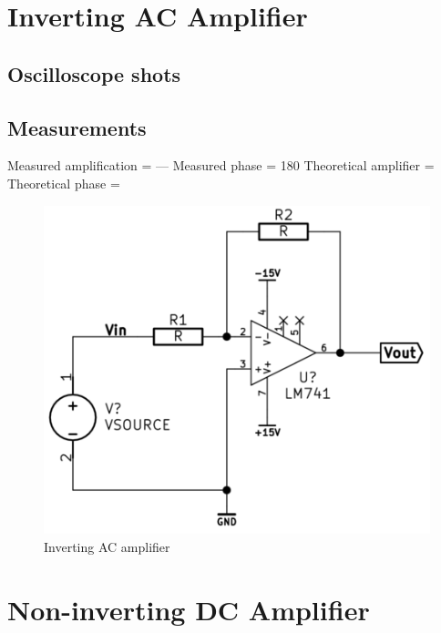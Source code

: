 \documentclass[]{article}
\begin{document}
\section{Inverting AC Amplifier}\label{inverting-ac-amplifier}

\subsection{Oscilloscope shots}\label{oscilloscope-shots}

\subsection{Measurements}\label{measurements-1}

Measured amplification = --- Measured phase = 180 Theoretical amplifier
=\\Theoretical phase =

\begin{figure}[htbp]
\centering
\includegraphics{img/invACamp.png}
\caption{Inverting AC amplifier}
\end{figure}

\section{Non-inverting DC Amplifier}\label{non-inverting-dc-amplifier}
\end{document}
